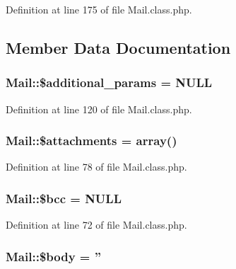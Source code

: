 Definition at line 175 of file Mail.\-class.\-php.



\subsection{Member Data Documentation}
\hypertarget{classMail_a38466de017089677f088c9a4025f724f}{
\subsubsection[{\$additional\-\_\-params}]{\setlength{\rightskip}{0pt plus 5cm}Mail\-::\$additional\-\_\-params = N\-U\-L\-L}}\label{classMail_a38466de017089677f088c9a4025f724f}


Definition at line 120 of file Mail.\-class.\-php.

\hypertarget{classMail_a93b05b1003cc8ea16b59c00d77f47466}{
\subsubsection[{\$attachments}]{\setlength{\rightskip}{0pt plus 5cm}Mail\-::\$attachments = array()}}\label{classMail_a93b05b1003cc8ea16b59c00d77f47466}


Definition at line 78 of file Mail.\-class.\-php.

\hypertarget{classMail_a2e25b3c43459422d40765d581b165692}{
\subsubsection[{\$bcc}]{\setlength{\rightskip}{0pt plus 5cm}Mail\-::\$bcc = N\-U\-L\-L}}\label{classMail_a2e25b3c43459422d40765d581b165692}


Definition at line 72 of file Mail.\-class.\-php.

\hypertarget{classMail_acbd542849121b33a76ed63e1c4670e02}{
\subsubsection[{\$body}]{\setlength{\rightskip}{0pt plus 5cm}Mail\-::\$body = ''}}\label{classMail_acbd542849121b33a76ed63e1c4670e02}


